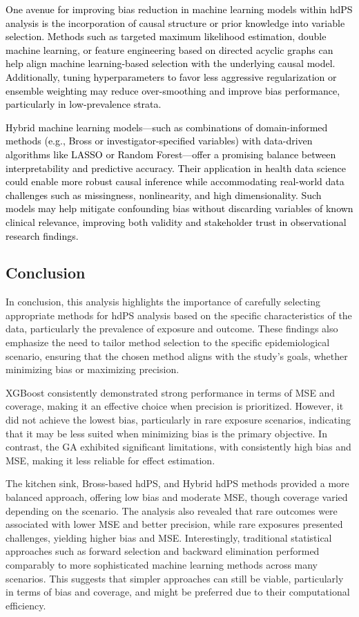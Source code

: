 \documentclass[10pt,letterpaper]{article}
\begin{document}
\textcolor{black}{One avenue for improving bias reduction in machine learning models within hdPS analysis is the incorporation of causal structure or prior knowledge into variable selection. Methods such as targeted maximum likelihood estimation, double machine learning, or feature engineering based on directed acyclic graphs can help align machine learning-based selection with the underlying causal model. Additionally, tuning hyperparameters to favor less aggressive regularization or ensemble weighting may reduce over-smoothing and improve bias performance, particularly in low-prevalence strata.}

\textcolor{black}{Hybrid machine learning models—such as combinations of domain-informed methods (e.g., Bross or investigator-specified variables) with data-driven algorithms like LASSO or Random Forest—offer a promising balance between interpretability and predictive accuracy. Their application in health data science could enable more robust causal inference while accommodating real-world data challenges such as missingness, nonlinearity, and high dimensionality. Such models may help mitigate confounding bias without discarding variables of known clinical relevance, improving both validity and stakeholder trust in observational research findings.}

\subsection{Conclusion}\label{conclusion}

In conclusion, this analysis highlights the importance of carefully
selecting appropriate methods for hdPS analysis based on the specific
characteristics of the data, particularly the prevalence of exposure and
outcome. These findings also emphasize the need to tailor method
selection to the specific epidemiological scenario, ensuring that the
chosen method aligns with the study's goals, whether minimizing bias or
maximizing precision.

XGBoost consistently demonstrated strong performance in terms of MSE and
coverage, making it an effective choice when precision is prioritized.
However, it did not achieve the lowest bias, particularly in rare
exposure scenarios, indicating that it may be less suited when
minimizing bias is the primary objective. In contrast, the GA exhibited
significant limitations, with consistently high bias and MSE, making it
less reliable for effect estimation.

The kitchen sink, Bross-based hdPS, and Hybrid hdPS methods provided a
more balanced approach, offering low bias and moderate MSE, though
coverage varied depending on the scenario. The analysis also revealed
that rare outcomes were associated with lower MSE and better precision,
while rare exposures presented challenges, yielding higher bias and MSE.
Interestingly, traditional statistical approaches such as forward
selection and backward elimination performed comparably to more
sophisticated machine learning methods across many scenarios. This
suggests that simpler approaches can still be viable, particularly in
terms of bias and coverage, and might be preferred due to their
computational efficiency.
\end{document}
